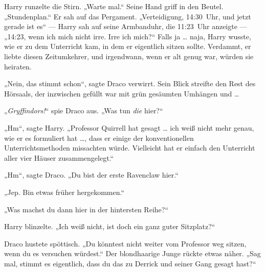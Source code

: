 Harry runzelte die Stirn.
„Warte mal.“ Seine Hand griff in den Beutel.
„Stundenplan.“ Er sah auf das Pergament.
„Verteidigung, 14:30~Uhr, und jetzt gerade ist es“ — Harry sah auf seine Armbanduhr, die 11:23~Uhr anzeigte — „14:23, wenn ich mich nicht irre. Irre ich mich?“ Falls ja … naja, Harry wusste, wie er zu dem Unterricht kam, in dem er eigentlich sitzen sollte. Verdammt, er liebte diesen Zeitumkehrer, und irgendwann, wenn er alt genug war, würden sie heiraten.

„Nein, das stimmt schon“, sagte Draco verwirrt. Sein Blick streifte den Rest des Hörsaals, der inzwischen gefüllt war mit grün gesäumten Umhängen und …

„\emph{Gryffindors!}“ spie Draco aus.
„Was tun \emph{die} hier?“

„Hm“, sagte Harry.
„Professor Quirrell hat gesagt … ich weiß nicht mehr genau, wie er es formuliert hat …, dass er einige der konventionellen Unterrichtsmethoden missachten würde. Vielleicht hat er einfach den Unterricht aller vier Häuser zusammengelegt.“

„Hm“, sagte Draco.
„Du bist der erste Ravenclaw hier.“

„Jep. Bin etwas früher hergekommen.“

„Was machst du dann hier in der hintersten Reihe?“

Harry blinzelte.
„Ich weiß nicht, ist doch ein ganz guter Sitzplatz?“

Draco hustete spöttisch.
„Du könntest nicht weiter vom Professor weg sitzen, wenn du es versuchen würdest.“ Der blondhaarige Junge rückte etwas näher.
„Sag mal, stimmt es eigentlich, dass du das zu Derrick und seiner Gang gesagt hast?“

